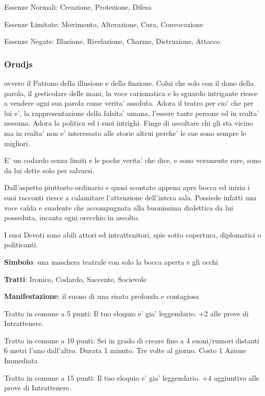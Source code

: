 \documentclass[a4paper,11pt,twoside,openany]{book}
\begin{document}
{Essenze Normali: Creazione, Protezione, Difesa

Essenze Limitate: Movimento, Alterazione, Cura, Convocazione

Essenze Negate: Illusione, Rivelazione, Charme, Distruzione, Attacco

\subsubsection{Orudjs}

\label{orudjs}

ovvero il Patrono della illusione e della finzione. Colui che solo con il dono della parola, il gesticolare delle mani, la voce carismatica e lo sguardo intrigante riesce a vendere ogni sua parola come verita' assoluta. Adora il teatro per cio' che per lui e', la rappresentazione della falsita' umana, l'essere tante persone ed in realta' nessuna. Adora la politica ed i suoi intrighi. Finge di ascoltare chi gli sta vicino ma in realta' non e' interessato alle storie altrui perche' le sue sono sempre le migliori.

E' un codardo senza limiti e le poche verita' che dice, e sono veramente rare, sono da lui dette solo per salvarsi.

Dall'aspetto piuttosto ordinario e quasi scontato appena apre bocca ed inizia i suoi racconti riesce a calamitare l'attenzione dell'intera sala. Possiede infatti una voce calda e suadente che accompagnata alla buonissima dialettica da lui posseduta, incanta ogni orecchio in ascolto.

I suoi Devoti sono abili attori ed intrattenitori, spie sotto copertura, diplomatici o politicanti.

\textbf{Simbolo}: una maschera teatrale con solo la bocca aperta e
gli occhi

\textbf{Tratti}: Ironico, Codardo, Saccente, Socievole

\textbf{Manifestazione}: il suono di una risata profonda e contagiosa

\bigskip

Tratto in comune a 5 punti: Il tuo eloquio e' gia' leggendario. +2 alle prove di Intrattenere.

Tratto in comune a 10 punti: Sei in grado di creare fino a 4 suoni/rumori distanti 6 metri l'uno dall'altro. Durata 1 minuto. Tre volte al giorno. Costo 1 Azione Immediata

Tratto in comune a 15 punti: Il tuo eloquio e' gia' leggendario. +4 aggiuntivo alle prove di Intrattenere.

}
\end{document}

